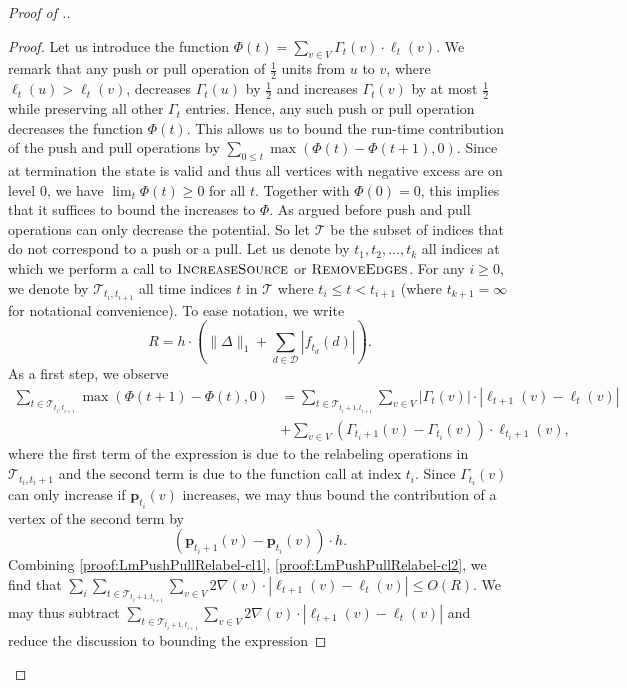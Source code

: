 \documentclass[11pt]{article}
\newcommand\bell{\boldsymbol{\mathit{\ell}}}
\newcommand\ff{\boldsymbol{\mathit{f}}}
\begin{document}
\begin{proof}[Proof of .]
\begin{proof}
    Let us introduce the function $\Phi(t) = \sum_{v \in V} \Gamma_t(v) \cdot \bell_t(v)$. We remark that any push or pull operation of $\frac{1}{2}$ units from $u$ to $v$, where $\bell_t(u) > \bell_t(v)$, decreases $\Gamma_t(u)$ by $\frac{1}{2}$ and increases $\Gamma_t(v)$ by at most $\frac{1}{2}$ while preserving all other $\Gamma_t$ entries. Hence, any such push or pull operation decreases the function $\Phi(t)$. This allows us to bound the run-time contribution of the push and pull operations by $\sum_{0 \leq t} \max(\Phi(t) - \Phi(t + 1), 0).$ Since at termination the state is valid and thus all vertices with negative excess are on level $0$, we have $\lim_t \Phi(t) \geq 0$ for all $t$. Together with $\Phi(0) = 0$, this implies that it suffices to bound the increases to $\Phi$. As argued before push and pull operations can only decrease the potential. So let $\mathcal{T}$ be the subset of indices that do not correspond to a push or a pull. Let us denote by $t_1, t_2, \dots, t_k$ all indices at which we perform a call to $\textsc{IncreaseSource}$ or $\textsc{RemoveEdges}$. 
    For any $i \geq 0,$  we denote by $\mathcal{T}_{t_i,t_{i+1}}$ all time indices $t$ in $\mathcal{T}$ where $t_i \leq t < t_{i+1}$ (where $t_{k+1} = \infty$ for notational convenience). To ease notation, we write 
    \[R = h \cdot \left( \|\Delta\|_1 + \sum_{d \in \mathcal{D}} |\ff_{t_d}(d)| \right).\]
    As a first step, we observe 
    \begin{align*}
        \sum_{t \in \mathcal{T}_{t_i,t_{i+1}}} \max(\Phi(t+1) - \Phi(t), 0) &= \sum_{t \in \mathcal{T}_{t_i + 1,t_{i+1}}} \sum_{v \in V} |\Gamma_t(v)| \cdot |\bell_{t+1}(v) - \bell_t(v)| \\
        &+ \sum_{v \in V}(\Gamma_{t_i + 1}(v) - \Gamma_{t_i}(v)) \cdot \bell_{t_i + 1}(v) ,
    \end{align*}
    where the first term of the expression is due to the relabeling operations in $\mathcal{T}_{t_i,t_i + 1}$ and the second term is due to the function call at index $t_i$. Since $\Gamma_{t_i}(v)$ can only increase if $\textbf{p}_{t_i}(v)$ increases, we may thus bound the contribution of a vertex of the second term by
    \begin{equation}\label{claim3-eq3}
        \left(\textbf{p}_{t_i + 1}(v) - \textbf{p}_{t_i}(v)\right) \cdot h.
    \end{equation}
    Combining \cref{proof:LmPushPullRelabel-cl1}, \cref{proof:LmPushPullRelabel-cl2}, we find that $\sum_i \sum_{t \in \mathcal{T}_{t_i + 1,t_{i+1}}} \sum_{v \in V} 2\nabla(v) \cdot |\bell_{t+1}(v) - \bell_t(v)| \leq O(R)$. We may thus subtract $\sum_{t \in \mathcal{T}_{t_i + 1,t_{i+1}}} \sum_{v \in V} 2\nabla(v) \cdot |\bell_{t+1}(v) - \bell_t(v)|$ and reduce the discussion to bounding the expression

\end{proof}
\end{proof}
\end{document}
